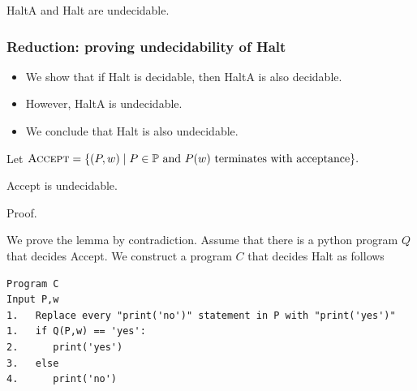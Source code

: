 
\begin{frame}
  \begin{lemma}
    {\sc HaltA} and {\sc Halt} are undecidable.
  \end{lemma}
\end{frame}

\begin{frame}
  \frametitle{Reduction: proving undecidability of {\sc Halt}}

  \begin{itemize}
  \item We show that if {\sc Halt} is decidable, then {\sc HaltA} is
    also decidable.
  \item However, {\sc HaltA is undecidable}.
  \item We conclude that {\sc Halt} is also undecidable.
  \end{itemize}
\end{frame}


\begin{frame}[fragile=true]
  
  {\small
    Let $\textsc{Accept} = \{(P,w) \;|\;
    \mbox{$P\in{\mathbb P}$ and $P(w)$ terminates with acceptance}\}.$
  }
  
  \begin{lemma}
    {\sc Accept} is undecidable.
  \end{lemma}
  \begin{block}{Proof.}

      We prove the lemma by contradiction.  Assume that there is a
      python program $Q$ that decides {\sc Accept}. \pause We
      construct a program $C$ that decides {\sc Halt} as follows \pause
      
      {\footnotesize
\begin{verbatim}
Program C       
Input P,w       
1.   Replace every "print('no')" statement in P with "print('yes')"
1.   if Q(P,w) == 'yes':
2.      print('yes')
3.   else
4.      print('no')
\end{verbatim}
      }

  \end{block}
\end{frame}

